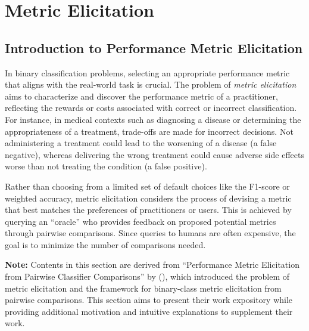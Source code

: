 \documentclass[
  letterpaper,
  numbers=noenddot,
  DIV=11]{scrreprt}
\theoremstyle{definition}
\theoremstyle{plain}
\theoremstyle{plain}
\theoremstyle{remark}
\begin{document}
\section{Metric Elicitation}\label{sec-metric-elicitation}

\subsection{Introduction to Performance Metric
Elicitation}\label{introduction-to-performance-metric-elicitation}

In binary classification problems, selecting an appropriate performance
metric that aligns with the real-world task is crucial. The problem of
\emph{metric elicitation} aims to characterize and discover the
performance metric of a practitioner, reflecting the rewards or costs
associated with correct or incorrect classification. For instance, in
medical contexts such as diagnosing a disease or determining the
appropriateness of a treatment, trade-offs are made for incorrect
decisions. Not administering a treatment could lead to the worsening of
a disease (a false negative), whereas delivering the wrong treatment
could cause adverse side effects worse than not treating the condition
(a false positive).

Rather than choosing from a limited set of default choices like the
F1-score or weighted accuracy, metric elicitation considers the process
of devising a metric that best matches the preferences of practitioners
or users. This is achieved by querying an ``oracle'' who provides
feedback on proposed potential metrics through pairwise comparisons.
Since queries to humans are often expensive, the goal is to minimize the
number of comparisons needed.

\textbf{Note:} Contents in this section are derived from ``Performance
Metric Elicitation from Pairwise Classifier Comparisons'' by
(),
which introduced the problem of metric elicitation and the framework for
binary-class metric elicitation from pairwise comparisons. This section
aims to present their work expository while providing additional
motivation and intuitive explanations to supplement their work.
\end{document}
